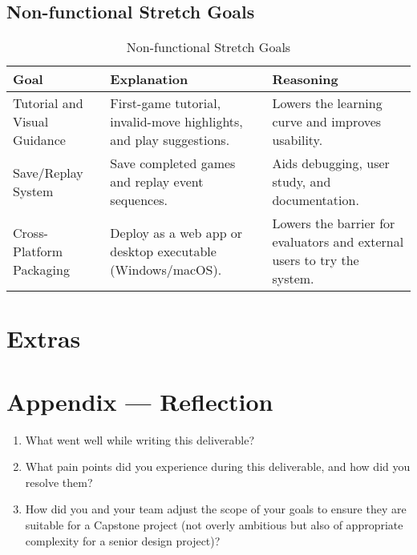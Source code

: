 \documentclass{article}
\begin{document}
    \subsection{Non-functional Stretch Goals}
    \begin{table}[H]
        \caption{Non-functional Stretch Goals}\label{TblStretchNonFunctionalGoals}
        \begin{tabular}{|p{}|p{}|p{}|}
            \hline
            \textbf{Goal} & \textbf{Explanation} & \textbf{Reasoning} \\
            \hline
            Tutorial and Visual Guidance &
            First-game tutorial, invalid-move highlights, and play suggestions. &
            Lowers the learning curve and improves usability. \\
            \hline
            Save/Replay System &
            Save completed games and replay event sequences. &
            Aids debugging, user study, and documentation. \\
            \hline
            Cross-Platform Packaging &
            Deploy as a web app or desktop executable (Windows/macOS). &
            Lowers the barrier for evaluators and external users to try the system. \\
            \hline
        \end{tabular}
    \end{table}

    \section{Extras}


    \newpage{}
    \section*{Appendix --- Reflection}

    

    \begin{enumerate}
        \item What went well while writing this deliverable?
        \item What pain points did you experience during this deliverable, and how
        did you resolve them?
        \item How did you and your team adjust the scope of your goals to ensure
        they are suitable for a Capstone project (not overly ambitious but also of
        appropriate complexity for a senior design project)?
    \end{enumerate}
\end{document}
